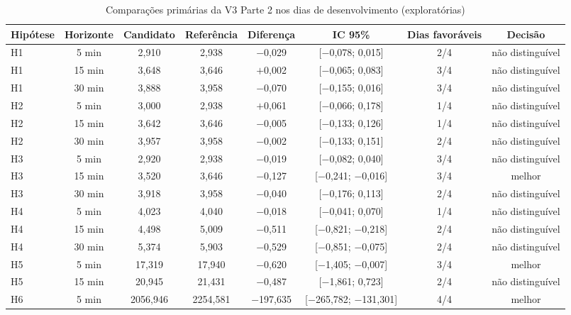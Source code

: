 \begin{table}[htb]
\caption{Comparações primárias da V3 Parte 2 nos dias de desenvolvimento (exploratórias)}
\label{tab:tab:v3p2-primarias}
\centering
\footnotesize
\setlength{\tabcolsep}{3pt}
\renewcommand{\arraystretch}{1.15}
\begin{tabular}{|l|c|c|c|c|c|c|c|}
\hline
\textbf{Hipótese} & \textbf{Horizonte} & \textbf{Candidato} & \textbf{Referência} & \textbf{Diferença} & \textbf{IC 95\%} & \textbf{Dias favoráveis} & \textbf{Decisão} \\
\hline
H1 & 5 min & 2{,}910 & 2{,}938 & $-$0{,}029 & [$-$0{,}078; 0{,}015] & 2/4 & não distinguível \\
H1 & 15 min & 3{,}648 & 3{,}646 & $+$0{,}002 & [$-$0{,}065; 0{,}083] & 3/4 & não distinguível \\
H1 & 30 min & 3{,}888 & 3{,}958 & $-$0{,}070 & [$-$0{,}155; 0{,}016] & 3/4 & não distinguível \\
H2 & 5 min & 3{,}000 & 2{,}938 & $+$0{,}061 & [$-$0{,}066; 0{,}178] & 1/4 & não distinguível \\
H2 & 15 min & 3{,}642 & 3{,}646 & $-$0{,}005 & [$-$0{,}133; 0{,}126] & 1/4 & não distinguível \\
H2 & 30 min & 3{,}957 & 3{,}958 & $-$0{,}002 & [$-$0{,}133; 0{,}151] & 2/4 & não distinguível \\
H3 & 5 min & 2{,}920 & 2{,}938 & $-$0{,}019 & [$-$0{,}082; 0{,}040] & 3/4 & não distinguível \\
H3 & 15 min & 3{,}520 & 3{,}646 & $-$0{,}127 & [$-$0{,}241; $-$0{,}016] & 3/4 & melhor \\
H3 & 30 min & 3{,}918 & 3{,}958 & $-$0{,}040 & [$-$0{,}176; 0{,}113] & 2/4 & não distinguível \\
H4 & 5 min & 4{,}023 & 4{,}040 & $-$0{,}018 & [$-$0{,}041; 0{,}070] & 1/4 & não distinguível \\
H4 & 15 min & 4{,}498 & 5{,}009 & $-$0{,}511 & [$-$0{,}821; $-$0{,}218] & 2/4 & não distinguível \\
H4 & 30 min & 5{,}374 & 5{,}903 & $-$0{,}529 & [$-$0{,}851; $-$0{,}075] & 2/4 & não distinguível \\
H5 & 5 min & 17{,}319 & 17{,}940 & $-$0{,}620 & [$-$1{,}405; $-$0{,}007] & 3/4 & melhor \\
H5 & 15 min & 20{,}945 & 21{,}431 & $-$0{,}487 & [$-$1{,}861; 0{,}723] & 2/4 & não distinguível \\
H6 & 5 min & 2056{,}946 & 2254{,}581 & $-$197{,}635 & [$-$265{,}782; $-$131{,}301] & 4/4 & melhor \\

\end{tabular}
\end{table}
